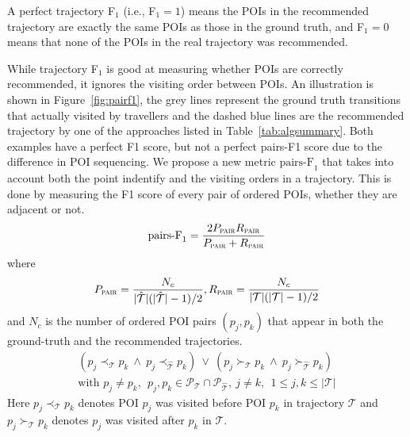 A perfect trajectory F$_1$ (i.e., F$_1 = 1$) means the POIs in
the recommended trajectory are exactly the same POIs as those in the ground truth,
and F$_1 = 0$ means that none of the POIs in the
real trajectory was recommended.

While trajectory F$_1$ is good at measuring whether POIs are correctly recommended,
it ignores the visiting order between POIs.
An illustration is shown in Figure~\ref{fig:pairf1},
the grey lines represent the ground truth transitions that actually visited by travellers
and the dashed blue lines are the recommended trajectory by one of the approaches listed
in Table~\ref{tab:algsummary}. Both examples have a perfect F1 score, but not a perfect 
pairs-F1 score due to the difference in POI sequencing.
We propose a new metric $\text{pairs-F}_1$ that takes into account 
both the point indentify and the visiting orders in a trajectory. 
This is done by measuring the F1 score of every pair of ordered POIs, whether they are adjacent or not. 
\begin{displaymath}
\text{pairs-F}_1 = \frac{2 P_{\textsc{pair}} R_{\textsc{pair}}}
                       {P_{\textsc{pair}} + R_{\textsc{pair}}}
\end{displaymath}
where
\begin{displaymath}\eqmoveup
P_{\textsc{pair}} = \frac{N_c} {|\hat{\mathcal{T}}|(|\hat{\mathcal{T}}|-1) / 2},
R_{\textsc{pair}} = \frac{N_c} {|\mathcal{T}|(|\mathcal{T}|-1) / 2}
\end{displaymath}
and $N_c$ is the number of ordered POI pairs $(p_j, p_k)$ that 
appear in both the ground-truth and the recommended trajectories. 
\begin{align*}
    (p_j \prec_{\mathcal{T}} p_k ~\land~ p_j \prec_{\hat{\mathcal{T}}} p_k)  ~\lor~
    (p_j \succ_{\mathcal{T}} p_k ~\land~ p_j \succ_{\hat{\mathcal{T}}} p_k) \\
    \text{with } p_j \ne p_k, ~~ p_j, p_k \in \mathcal{P}_{\mathcal{T}} \cap \mathcal{P}_{\hat{\mathcal{T}}}, ~
    j \ne k, ~~ 1 \le j, k \le |\mathcal{T}|
\end{align*}
Here $p_j \prec_{\mathcal{T}} p_k$ denotes POI $p_j$ was visited before POI $p_k$ in trajectory $\mathcal{T}$
and $p_j \succ_{\mathcal{T}} p_k$ denotes $p_j$ was visited after $p_k$ in $\mathcal{T}$.

